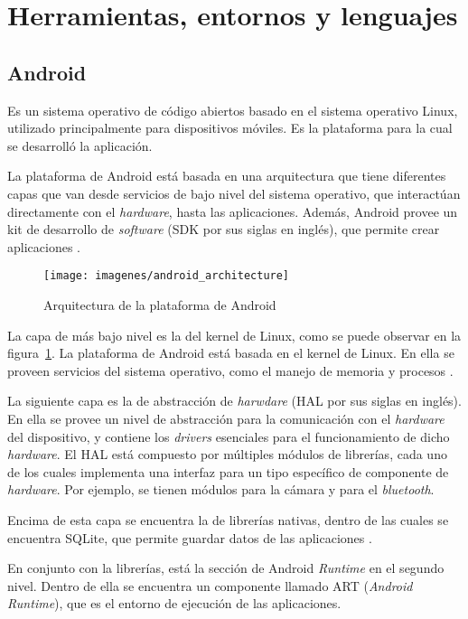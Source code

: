 \section{Herramientas, entornos y lenguajes} \label{Herramientas, entornos y lenguajes}


\subsection{Android}
Es un sistema operativo de código abiertos basado en el sistema operativo Linux, utilizado principalmente para dispositivos móviles\cite{AND1}. Es la plataforma para la cual se desarrolló la aplicación. 

La plataforma de Android está basada en una arquitectura que tiene diferentes capas que van desde servicios de bajo nivel del sistema operativo, que interactúan directamente con el \textit{hardware}, hasta las aplicaciones. Además, Android provee un kit de desarrollo de \textit{software} (SDK por sus siglas en inglés), que permite crear aplicaciones \cite{AND3}.

\begin{figure}[ht]
  \centering
  \texttt{[image: imagenes/android\_architecture]}
  \caption{Arquitectura de la plataforma de Android}
  \label{fig:arquitecturaAndroid}
\end{figure}

La capa de más bajo nivel es la del kernel de Linux, como se puede observar en la figura~\ref{fig:arquitecturaAndroid}. La plataforma de Android está basada en el kernel de Linux. En ella se proveen servicios del sistema operativo, como el manejo de memoria y procesos \cite{AND3}.

La siguiente capa es la de abstracción de \textit{harwdare} (HAL por sus siglas en inglés). En ella se provee un nivel de abstracción para la comunicación con el \textit{hardware} del dispositivo, y contiene los \textit{drivers} esenciales para el funcionamiento de dicho \textit{hardware}. El HAL está compuesto por múltiples módulos de librerías, cada uno de los cuales implementa una interfaz para un tipo específico de componente de \textit{hardware}. Por ejemplo, se tienen módulos para la cámara y para el \textit{bluetooth}.

Encima de esta capa se encuentra la de librerías nativas, dentro de las cuales se encuentra SQLite, que permite guardar datos de las aplicaciones \cite{AND3}.

En conjunto con la librerías, está la sección de Android \textit{Runtime} en el segundo nivel. Dentro de ella se encuentra un componente llamado ART (\textit{Android Runtime}), que es el entorno de ejecución de las aplicaciones\cite{AND3}.

